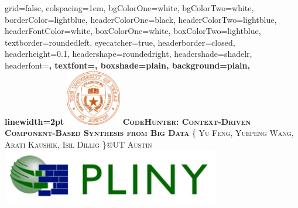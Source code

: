 \documentclass[landscape,final,a0paper,fontscale=0.285]{baposter}
\begin{document}
\begin{poster}%
  {
  grid=false,
  colspacing=1em,
  bgColorOne=white,
  bgColorTwo=white,
  borderColor=lightblue,
  headerColorOne=black,
  headerColorTwo=lightblue,
  headerFontColor=white,
  boxColorOne=white,
  boxColorTwo=lightblue,
  textborder=roundedleft,
  eyecatcher=true,
  headerborder=closed,
  headerheight=0.1\textheight,
  headershape=roundedright,
  headershade=shadelr,
  headerfont=\Large\bf\textsc, %
  textfont={\setlength{\parindent}{1.5em}},
  boxshade=plain,
  background=plain,
  linewidth=2pt
  }
  {\includegraphics[height=6.5em]{images/ut.png}} 
  {\bf\textsc{CodeHunter: Context-Driven Component-Based  Synthesis from Big Data}\vspace{0.1em}}
  {\textsc{\{ Yu Feng, Yuepeng Wang, Arati Kaushik, Isil Dillig \}@UT Austin}}
  {%
    \includegraphics[height=6.5em]{images/pliny.png}
  }

    \newcommand{\colouredcircle}{%
      \tikz{\useasboundingbox (-0.2em,-0.32em) rectangle(0.2em,0.32em); \draw[draw=black,fill=lightblue,line width=0.03em] (0,0) circle(0.18em);}}


\end{poster}
\end{document}
